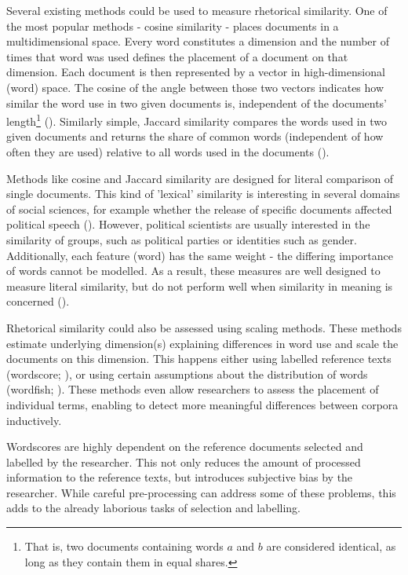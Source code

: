 \documentclass{article}
\begin{document}
Several existing methods could be used to measure rhetorical similarity. One of the most popular methods - cosine similarity - places documents in a multidimensional space. Every word constitutes a dimension and the number of times that word was used defines the placement of a document on that dimension. Each document is then represented by a vector in high-dimensional (word) space. The cosine of the angle between those two vectors indicates how similar the word use in two given documents is, independent of the documents' length\footnote{That is, two documents containing words $a$ and $b$ are considered identical, as long as they contain them in equal shares.} (\cite{Similarity2007a}).  Similarly simple, Jaccard similarity compares the words used in two given documents and returns the share of common words (independent of how often they are used) relative to all words used in the documents (\cite{Jaccard1912}).\par

Methods like cosine and Jaccard similarity are designed for literal comparison of single documents. This kind of 'lexical' similarity is interesting in several domains of social sciences, for example whether the release of specific documents affected political speech (\cite{Similarity2007a, Hager2020}). However, political scientists are usually interested in the similarity of groups, such as political parties or identities such as gender. Additionally, each feature (word) has the same weight - the differing importance of words cannot be modelled.%
As a result, these measures are well designed to measure literal similarity, but do not perform well when similarity in meaning is concerned (\cite{Prasetya2018}).\par

Rhetorical similarity could also be assessed using scaling methods. These methods estimate underlying dimension(s) explaining differences in word use and scale the documents on this dimension. This happens either using labelled reference texts (wordscore; \cite{Laver2003}), or using certain assumptions about the distribution of words (wordfish; \cite{Slapin2008}). These methods even allow researchers to assess the placement of individual terms, enabling to detect more meaningful differences between corpora inductively. \par

Wordscores are highly dependent on the reference documents selected and labelled by the researcher. This not only reduces the amount of processed information to the reference texts, but introduces subjective bias by the researcher. While careful pre-processing can address some of these problems, this adds to the already laborious tasks of selection and labelling.\par
\end{document}
